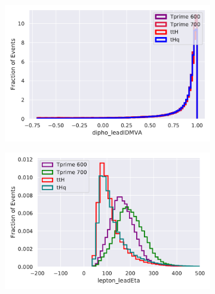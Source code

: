 \begin{figure}[H]
\begin{subfigure}{.5\textwidth}
  \centering
  \includegraphics[width=.8\linewidth]{Figure_2/dipho_leadIDMVA.pdf}  
  \caption{}
  \label{fig:sub-third}
\end{subfigure}
\begin{subfigure}{.5\textwidth}
  \centering
  \includegraphics[width=.8\linewidth]{Figure_2/dipho_leadPt.pdf}  
  \label{fig:sub-fourth}
\end{subfigure}



\end{figure}
